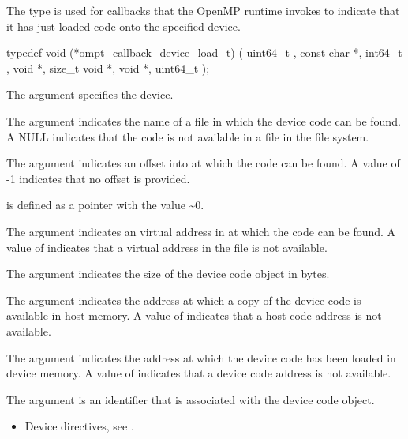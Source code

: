 \summary
The  type is used for callbacks that 
the OpenMP runtime invokes to indicate that it has just loaded code onto 
the specified device.

\format
\begin{ccppspecific}
\begin{omptCallback}
typedef void (*ompt_callback_device_load_t) (
  uint64_t ,
  const char *,
  int64_t ,
  void *,
  size_t 
  void *,
  void *,
  uint64_t 
);
\end{omptCallback}
\end{ccppspecific}

\argdesc
The  argument specifies the device.

The  argument indicates the name of a file in which the device 
code can be found. A NULL  indicates that the code is not available 
in a file in the file system.

The  argument indicates an offset into  at 
which the code can be found. A value of -1 indicates that no offset is provided.

 is defined as a pointer with the value \textasciitilde 0.

The  argument indicates an virtual address in  
at which the code can be found. A value of  indicates that 
a virtual address in the file is not available.

The argument  indicates the size of the device code object in bytes.

The  argument indicates the address at which a copy of the device 
code is available in host memory. A value of  indicates that 
a host code address is not available.

The  argument indicates the address at which the device code has 
been loaded in device memory. A value of  indicates that a 
device code address is not available.

The  argument is an identifier that is associated with the device 
code object.

\crossreferences
\begin{itemize}
\item Device directives, see .
\end{itemize}



